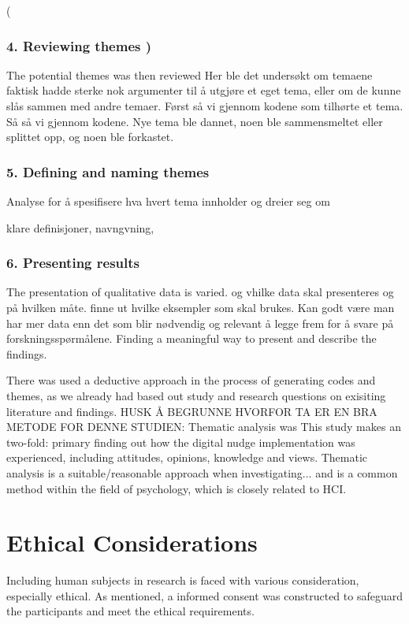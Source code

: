    ( \subsubsection{4. Reviewing themes )}
The potential themes was then reviewed 
Her ble det undersøkt om temaene faktisk hadde sterke nok argumenter til å utgjøre et eget tema, eller om de kunne slås sammen med andre temaer. 
Først så vi gjennom kodene som tilhørte et tema. Så så vi gjennom kodene. Nye tema ble dannet, noen ble sammensmeltet eller splittet opp, og noen ble forkastet. 

    \subsubsection{5. Defining and naming themes}
Analyse for å spesifisere hva hvert tema innholder og dreier seg om

klare definisjoner, navngvning, 
    
    \subsubsection{6. Presenting results}
    The presentation of qualitative data is varied. og vhilke data skal presenteres og på hvilken måte. finne ut hvilke eksempler som skal brukes. Kan godt være man har mer data enn det som blir nødvendig og relevant å legge frem for å svare på forskningsspørmålene. 
    Finding a meaningful way to present and describe the findings. 
    
    There was used a deductive approach in the process of generating codes and themes, as we already had based out study and research questions on exisiting literature and findings. 
    HUSK Å BEGRUNNE HVORFOR TA ER EN BRA METODE FOR DENNE STUDIEN: Thematic analysis was 
    This study makes an two-fold: primary finding out how the digital nudge implementation was experienced, including attitudes, opinions, knowledge and views. Thematic analysis is a suitable/reasonable approach when investigating... and is a common method within the field of psychology, which is closely related to HCI. 

\section{Ethical Considerations}
Including human subjects in research is faced with various consideration, especially ethical. As mentioned, a informed consent was constructed to safeguard the participants and meet the ethical requirements. 

